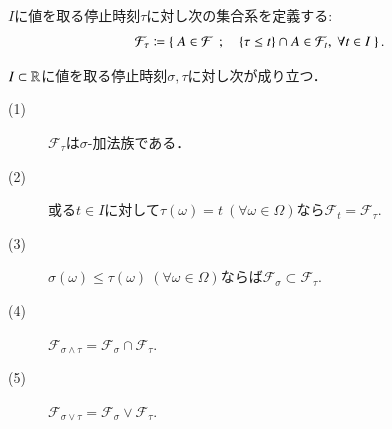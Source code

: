 	\begin{screen}
		\begin{dfn}[停止時刻で定まる事象系]
			$I$に値を取る停止時刻$\tau$に対し次の集合系を定義する:
			\begin{align}
				\mathcal{F}_\tau \coloneqq \left\{\ A \in \mathcal{F}\ \, ; \quad \{ \tau \leq t \} \cap A \in \mathcal{F}_t,\ \forall t \in I\ \right\}.
			\end{align}
		\end{dfn}
	\end{screen}
	
	\begin{screen}
		\begin{prp}[停止時刻の性質]
			$I \subset \mathbb{R}$に値を取る停止時刻$\sigma, \tau$に対し次が成り立つ．
			\begin{description}
				\item[(1)] $\mathcal{F}_\tau$は$\sigma$-加法族である．
				\item[(2)] 或る$t \in I$に対して$\tau(\omega) = t\ (\forall \omega \in \Omega)$なら$\mathcal{F}_t = \mathcal{F}_\tau$.
				\item[(3)] $\sigma(\omega) \leq \tau(\omega)\ (\forall \omega \in \Omega)$ならば$\mathcal{F}_\sigma \subset \mathcal{F}_\tau$.
				\item[(4)] $\mathcal{F}_{\sigma \wedge \tau} = \mathcal{F}_\sigma \cap \mathcal{F}_\tau$.
				\item[(5)] $\mathcal{F}_{\sigma \vee \tau} = \mathcal{F}_\sigma \vee \mathcal{F}_\tau$.
			\end{description}
			\label{prp:properties_of_stopping_times}
		\end{prp}
	\end{screen}
	
